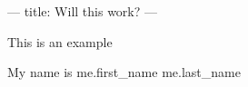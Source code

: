---
title: Will this work?
---

This is an example

My name is {{ me.first_name }} {{ me.last_name }}